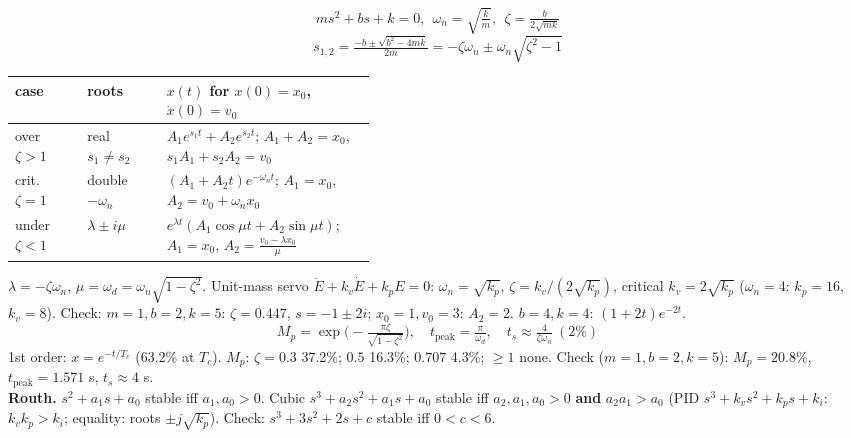 \begin{multicols}{3}
\nopagebreak[4]
\begin{fbx}[$m\ddot x+b\dot x+kx=0$ \pg{W8 16--26}]
\[ms^2+bs+k=0,\ \ \omega_n=\sqrt{\tfrac km},\ \ \zeta=\tfrac b{2\sqrt{mk}}\]
\[s_{1,2}=\tfrac{-b\pm\sqrt{b^2-4mk}}{2m}=-\zeta\omega_n\pm\omega_n\sqrt{\zeta^2-1}\]
\begin{tabularx}{\linewidth}{@{}>{\raggedright\arraybackslash}p{0.2\linewidth}>{\raggedright\arraybackslash}p{0.22\linewidth}X@{}}\toprule
case & roots & $x(t)$ for $x(0)=x_0$, $\dot x(0)=v_0$\\\midrule
over $\zeta>1$ & real $s_1\ne s_2$ & $A_1e^{s_1t}+A_2e^{s_2t}$; $A_1+A_2=x_0$, $s_1A_1+s_2A_2=v_0$\\[1pt]
crit. $\zeta=1$ & double $-\omega_n$ & $(A_1+A_2t)e^{-\omega_nt}$; $A_1=x_0$, $A_2=v_0+\omega_nx_0$\\[1pt]
under $\zeta<1$ & $\lambda\pm i\mu$ & $e^{\lambda t}(A_1\cos\mu t+A_2\sin\mu t)$; $A_1=x_0$, $A_2=\frac{v_0-\lambda x_0}\mu$\\\bottomrule
\end{tabularx}
$\lambda=-\zeta\omega_n$, $\mu=\omega_d=\omega_n\sqrt{1-\zeta^2}$. Unit-mass servo $\ddot E+k_v\dot E+k_pE=0$: $\omega_n=\sqrt{k_p}$, $\zeta=k_v/(2\sqrt{k_p})$, critical $k_v=2\sqrt{k_p}$ ($\omega_n=4$: $k_p=16$, $k_v=8$). Check: $m=1,b=2,k=5$: $\zeta=0.447$, $s=-1\pm2i$; $x_0=1,v_0=3$: $A_2=2$. $b=4,k=4$: $(1+2t)e^{-2t}$. \chk
\[M_p=\exp\!\Big(\!-\tfrac{\pi\zeta}{\sqrt{1-\zeta^2}}\Big),\quad t_{\text{peak}}=\tfrac\pi{\omega_d},\quad t_s\approx\tfrac4{\zeta\omega_n}\ (2\%)\]
1st order: $x=e^{-t/T_c}$ ($63.2\%$ at $T_c$).
$M_p$: $\zeta=0.3$ 37.2\%; $0.5$ 16.3\%; $0.707$ 4.3\%; $\ge1$ none. Check ($m{=}1,b{=}2,k{=}5$): $M_p=20.8\%$, $t_{\text{peak}}=1.571$ s, $t_s\approx4$ s. \chk\\
\textbf{Routh.} $s^2+a_1s+a_0$ stable iff $a_1,a_0>0$. Cubic $s^3+a_2s^2+a_1s+a_0$ stable iff $a_2,a_1,a_0>0$ \textbf{and} $a_2a_1>a_0$ (PID $s^3+k_vs^2+k_ps+k_i$: $k_vk_p>k_i$; equality: roots $\pm j\sqrt{k_p}$). Check: $s^3+3s^2+2s+c$ stable iff $0<c<6$. \chk
\end{fbx}


\end{multicols}
